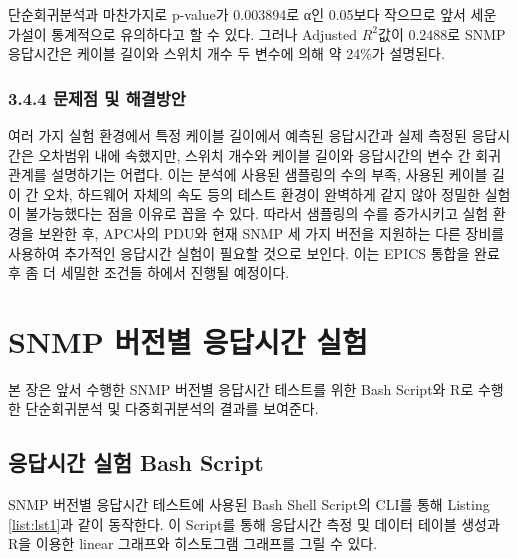 \documentclass[11pt
  , a4paper
  , article
  , oneside
]{memoir}
\begin{document}
단순회귀분석과 마찬가지로 p-value가 0.003894로 α인 0.05보다 작으므로 앞서 세운 가설이 통계적으로 유의하다고 할 수 있다. 그러나 Adjusted $  R^2  $값이 0.2488로 SNMP 응답시간은 케이블 길이와 스위치 개수 두 변수에 의해 약 24\%가 설명된다.

 \subsection{3.4.4 문제점 및 해결방안}
여러 가지 실험 환경에서 특정 케이블 길이에서 예측된 응답시간과 실제 측정된 응답시간은 오차범위 내에 속했지만, 스위치 개수와 케이블 길이와 응답시간의 변수 간 회귀관계를 설명하기는 어렵다. 이는 분석에 사용된 샘플링의 수의 부족, 사용된 케이블 길이 간 오차, 하드웨어 자체의 속도 등의 테스트 환경이 완벽하게 같지 않아 정밀한 실험이 불가능했다는 점을 이유로 꼽을 수 있다.  따라서 샘플링의 수를 증가시키고 실험 환경을 보완한 후, APC사의 PDU와 현재 SNMP 세 가지 버전을 지원하는 다른 장비를 사용하여 추가적인 응답시간 실험이 필요할 것으로 보인다. 이는 EPICS 통합을 완료 후 좀 더 세밀한 조건들 하에서 진행될 예정이다.

\clearpage
\appendix
\addappheadtotoc
\renewcommand*\printchaptername{\Large\bfseries\appendixname~}
\chapter{SNMP 버전별 응답시간 실험}

본 장은 앞서 수행한 SNMP 버전별 응답시간 테스트를 위한 Bash Script와 R로 수행한 단순회귀분석 및 다중회귀분석의 결과를 보여준다.

\section{응답시간 실험 Bash Script}
SNMP 버전별 응답시간 테스트에 사용된 Bash Shell Script의 CLI를 통해 Listing \ref{list:lst1}과 같이 동작한다. 이 Script를 통해 응답시간 측정 및 데이터 테이블 생성과 R을 이용한 linear 그래프와 히스토그램 그래프를 그릴 수 있다.
\end{document}

